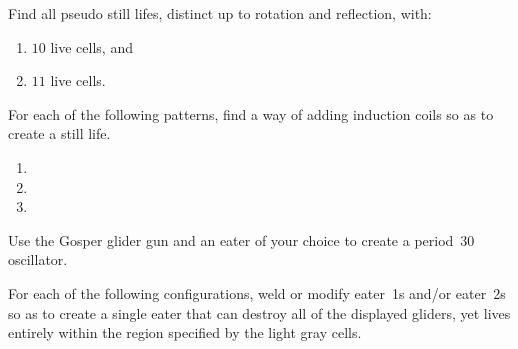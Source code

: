 \begin{multicols}{2}
	
	\begin{problem}\label{exer:small_pseudo_still_lifes}
		Find all pseudo still lifes, distinct up to rotation and reflection, with:\smallskip
		
		\begin{enumerate}[label=\bf\color{ocre}(\alph*)]
			\item $10$ live cells, and
			
			\item $11$ live cells.
		\end{enumerate}
	\end{problem}
	
	
	\mfilbreak
	
	
	\begin{problemstar}\label{exer:still_life_add_coil}
		For each of the following patterns, find a way of adding induction coils so as to create a still life.\vspace*{-0.25cm}
		
		\begin{multicols}{2}\setlength{\columnsep}{1pt}
			\begin{enumerate}[label=(\alph*),series=exer_induction_coil]
				\item[\bf\color{ocre}(a)] 
				
				\item[\bf\color{ocre}(c)] 
				
				\item[\bf\color{ocre}(b)] 
			\end{enumerate}
		\end{multicols}
	\end{problemstar}
	
	
	\mfilbreak
	
	
	\begin{problem}\label{exer:gosper_oscillator}
		Use the Gosper glider gun and an eater of your choice to create a period~30 oscillator.
	\end{problem}
	
	
	\mfilbreak
	
	
	\begin{problemstar}\label{exer:eater_weld}
		For each of the following configurations, weld or modify eater~1s and/or eater~2s so as to create a single eater that can destroy all of the displayed gliders, yet lives entirely within the region specified by the light gray cells.\vspace*{-0.25cm}
		

\end{problemstar}
\end{multicols}
